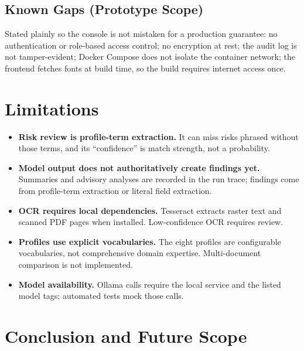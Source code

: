 \documentclass[11pt,a4paper]{article}
\begin{document}
\subsection{Known Gaps (Prototype Scope)}
Stated plainly so the console is not mistaken for a production guarantee:
no authentication or role-based access control; no encryption at rest; the
audit log is not tamper-evident; Docker Compose does not isolate the container
network; the frontend fetches fonts at build time, so the build requires
internet access once.

\section{Limitations}

\begin{itemize}[leftmargin=1.4em]
  \item \textbf{Risk review is profile-term extraction.} It can miss risks
        phrased without those terms, and its ``confidence'' is match strength,
        not a probability.
  \item \textbf{Model output does not authoritatively create findings yet.}
        Summaries and advisory analyses are recorded in the run trace;
        findings come from profile-term extraction or literal field
        extraction.
  \item \textbf{OCR requires local dependencies.} Tesseract extracts raster text and scanned PDF pages when installed. Low-confidence OCR requires review.
  \item \textbf{Profiles use explicit vocabularies.} The eight profiles are configurable vocabularies, not comprehensive domain
        expertise. Multi-document comparison is not implemented.
  \item \textbf{Model availability.} Ollama calls require the local service
        and the listed model tags; automated tests mock those calls.
\end{itemize}

\section{Conclusion and Future Scope}
\end{document}
